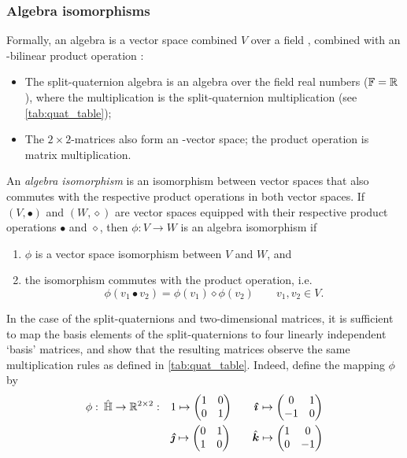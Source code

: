\subsubsection{Algebra isomorphisms} 
Formally, an algebra is a vector space combined \(V\) over a field \field, combined with an \field-bilinear product operation \cite{Schuller2014}:
\begin{itemize}
    \item The split-quaternion algebra is an algebra over the field real numbers (\(\mathbb{F} = \mathbb{R}\)), where the multiplication is the split-quaternion multiplication (see \cref{tab:quat_table});
    \item The \(2\times2\)-matrices also form an \real-vector space; the product operation is matrix multiplication.
\end{itemize}

An \emph{algebra isomorphism} is an isomorphism between vector spaces that also commutes with the respective product operations in both vector spaces. If \((V, \bullet)\) and \((W, \diamond)\) are vector spaces equipped with their respective product operations $\bullet$ and $\diamond$, then \(\phi: V \to W\) is an algebra isomorphism if \cite{Lang2002}
\begin{enumerate}[label=(\roman*)]
    \item \(\phi\) is a vector space isomorphism between \(V\) and \(W\), and 
    \item the isomorphism commutes with the product operation, i.e. 
    \begin{equation}
         \phi(v_1 \bullet v_2) = \phi(v_1)\diamond\phi(v_2) \qquad v_1, v_2 \in V.
    \end{equation}
\end{enumerate}

In the case of the split-quaternions and two-dimensional matrices, it is sufficient to map the basis elements of the split-quaternions to four linearly independent `basis' matrices, and show that the resulting matrices observe the same multiplication rules as defined in \cref{tab:quat_table}. Indeed, define the mapping \(\phi\) by 
\begin{equation}
    \begin{split}
        \phi: \: \spquaternions \to \real^{2\times2}: \quad &  
         1 \mapsto  \mqty(1 & 0 \\ 0 & 1) \qquad
        \quati \mapsto  \mqty(0 & 1 \\  -1 & 0) \\
        & \quatj \mapsto  \mqty(0 & 1 \\  1 & 0)\qquad 
        \quatk \mapsto  \mqty(1 & 0 \\  0 & -1) \\
    \end{split}
    \label{eq:basis_elements}
\end{equation}

